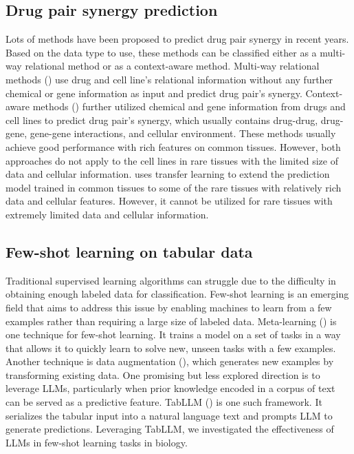 {\subsection{Drug pair synergy prediction}
Lots of methods have been proposed to predict drug pair synergy in recent years. Based on the data type to use, these methods can be classified either as a multi-way relational method or as a context-aware method. Multi-way relational methods (\cite{chen_drugcom_2018, 10.1093/bioinformatics/btaa287, 10.1093/bioinformatics/btac579}) use drug and cell line's relational information without any further chemical or gene information as input and predict drug pair’s synergy. Context-aware methods (\cite{preuer_deepsynergy_2018, liu_transynergy_2021, kuru_matchmaker_2022, hosseini_ccsynergy_2023}) further utilized chemical and gene information from drugs and cell lines to predict drug pair's synergy, which usually contains drug-drug, drug-gene, gene-gene interactions, and cellular environment. These methods usually achieve good performance with rich features on common tissues. However, both approaches do not apply to the cell lines in rare tissues with the limited size of data and cellular information. \cite{kim_anticancer_2021} uses transfer learning to extend the prediction model trained in common tissues to some of the rare tissues with relatively rich data and cellular features. However, it cannot be utilized for rare tissues with extremely limited data and cellular information.




\subsection{Few-shot learning on tabular data}
Traditional supervised learning algorithms can struggle due to the difficulty in obtaining enough labeled data for classification. Few-shot learning is an emerging field that aims to address this issue by enabling machines to learn from a few examples rather than requiring a large size of labeled data. Meta-learning (\cite{finn_model-agnostic_2017, Wang2023-iw, Gao2023-se}) is one technique for few-shot learning. It trains a model on a set of tasks in a way that allows it to quickly learn to solve new, unseen tasks with a few examples. Another technique is data augmentation (\cite{nam_stunt_2023, Yang2022-ne}), which generates new examples by transforming existing data. One promising but less explored direction is to leverage LLMs, particularly when prior knowledge encoded in a corpus of text can be served as a predictive feature. TabLLM (\cite{hegselmann_tabllm_2023}) is one such framework.  It serializes the tabular input into a natural language text and prompts LLM to generate predictions. Leveraging TabLLM, we investigated the effectiveness of LLMs in few-shot learning tasks in biology. 


}
